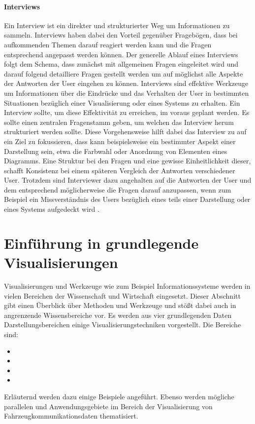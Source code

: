 \documentclass[draft=false
              ,paper=a4
              ,twoside=false
              ,fontsize=11pt
              ,headsepline
              ,BCOR10mm
              ,DIV11
              ]{scrbook}
\newcommand{\TODO}[1]{\colorbox{yellow}{\textcolor{red}{[TODO: #1]}}}
\begin{document}
\paragraph{Interviews} %
\label{par:interviews}
Ein Interview ist ein direkter und strukturierter Weg um Informationen zu sammeln. Interviews haben dabei den Vorteil gegenüber Fragebögen, dass bei aufkommenden Themen darauf reagiert werden kann und die Fragen entsprechend angepasst werden können. Der generelle Ablauf eines Interviews folgt dem Schema, dass zunächst mit allgemeinen Fragen eingeleitet wird und darauf folgend detailliere Fragen gestellt werden um auf möglichst alle Aspekte der Antworten der User eingehen zu können.
Interviews sind effektive Werkzeuge um Informationen über die Eindrücke und das Verhalten der User in bestimmten Situationen bezüglich einer Visualisierung oder eines Systems zu erhalten. Ein Interview sollte, um diese Effektivität zu erreichen, im voraus geplant werden. Es sollte einen zentralen Fragenstamm geben, um welchen das Interview herum strukturiert werden sollte. Diese Vorgehensweise hilft dabei das Interview zu auf ein Ziel zu fokussieren, dass kann beispielsweise ein bestimmter Aspekt einer Darstellung sein, etwa die Farbwahl oder Anordnung von Elementen eines Diagramms. Eine Struktur bei den Fragen und eine gewisse Einheitlichkeit dieser, schafft Konsistenz bei einem späteren Vergleich der Antworten verschiedener User. Trotzdem sind Interviewer dazu angehalten auf die Antworten der User und dem entsprechend möglicherweise die Fragen darauf anzupassen, wenn zum Beispiel ein Missverständnis des Users bezüglich eines teils einer Darstellung oder eines Systems aufgedeckt wird \cite{ader_advising_2008}.

\section{Einführung in grundlegende Visualisierungen} %
\label{sec:einfuhrung_in_grundlegende_visualisierungen}
Visualisierungen und Werkzeuge wie zum Beispiel Informationssysteme werden in vielen Bereichen der Wissenschaft und Wirtschaft eingesetzt. Dieser Abschnitt gibt einen Überblick über Methoden und Werkzeuge und stößt dabei auch in angrenzende Wissensbereiche vor. Es werden aus vier grundlegenden Daten Darstellungsbereichen einige Visualisierungstechniken vorgestellt. Die Bereiche sind:
\begin{itemize}
   \item {}
   \item {}
   \item {}
   \item {}
 \end{itemize} 
Erläuternd werden dazu einige Beispiele angeführt. Ebenso werden mögliche parallelen und Anwendungsgebiete im Bereich der Visualisierung von Fahrzeugkommunikationsdaten thematisiert. 
\end{document}
